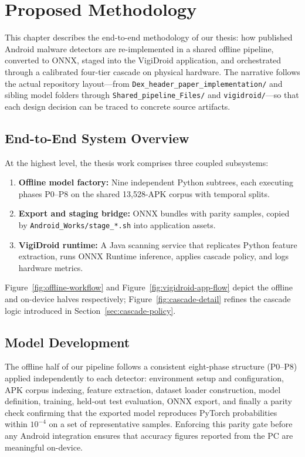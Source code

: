 \chapter{Proposed Methodology}\label{Proposed Methodology}

This chapter describes the end-to-end methodology of our thesis: how published Android malware detectors are re-implemented in a shared offline pipeline, converted to ONNX, staged into the VigiDroid application, and orchestrated through a calibrated four-tier cascade on physical hardware. The narrative follows the actual repository layout---from \texttt{Dex\_header\_paper\_implementation/} and sibling model folders through \texttt{Shared\_pipeline\_Files/} and \texttt{vigidroid/}---so that each design decision can be traced to concrete source artifacts.

\section{End-to-End System Overview}
At the highest level, the thesis work comprises three coupled subsystems:
\begin{enumerate}
 \item \textbf{Offline model factory:} Nine independent Python subtrees, each executing phases P0--P8 on the shared 13,528-APK corpus with temporal splits.
 \item \textbf{Export and staging bridge:} ONNX bundles with parity samples, copied by \texttt{Android\_Works/stage\_*.sh} into application assets.
 \item \textbf{VigiDroid runtime:} A Java scanning service that replicates Python feature extraction, runs ONNX Runtime inference, applies cascade policy, and logs hardware metrics.
\end{enumerate}
Figure~\ref{fig:offline-workflow} and Figure~\ref{fig:vigidroid-app-flow} depict the offline and on-device halves respectively; Figure~\ref{fig:cascade-detail} refines the cascade logic introduced in Section~\ref{sec:cascade-policy}.

\section{Model Development}
 
The offline half of our pipeline follows a consistent eight-phase structure (P0--P8) applied independently to each detector: environment setup and configuration, APK corpus indexing, feature extraction, dataset loader construction, model definition, training, held-out test evaluation, ONNX export, and finally a parity check confirming that the exported model reproduces PyTorch probabilities within $10^{-4}$ on a set of representative samples. Enforcing this parity gate before any Android integration ensures that accuracy figures reported from the PC are meaningful on-device.
 
